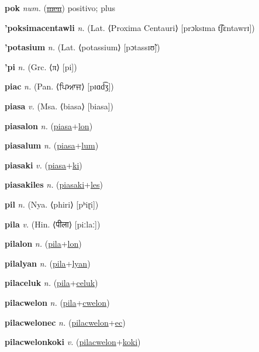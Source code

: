 \textbf{\hypertarget{pok}{pok}} \textit{num.} (\hyperlink{men}{\sout{men}})
positivo; plus

\textbf{\hypertarget{'poksimacentawli}{'poksimacentawli}} \textit{n.} (Lat. ⟨Proxima Centauri⟩ [prɔksɪma t͡ʃɛntawrɪ])


\textbf{\hypertarget{'potasium}{'potasium}} \textit{n.} (Lat. ⟨potassium⟩ [pɔtassɪʊ̃])


\textbf{\hypertarget{'pi}{'pi}} \textit{n.} (Grc. ⟨π⟩ [pi])


\textbf{\hypertarget{piac}{piac}} \textit{n.} (Pan. ⟨{\gurmukhi{}ਪਿਆਜ}⟩ [pɪɑd͡ʒ])


\textbf{\hypertarget{piasa}{piasa}} \textit{v.} (Msa. ⟨biasa⟩ [biasa])


\textbf{\hypertarget{piasalon}{piasalon}} \textit{n.} (\hyperlink{piasa}{piasa}+\allowbreak \hyperlink{lon}{lon})


\textbf{\hypertarget{piasalum}{piasalum}} \textit{n.} (\hyperlink{piasa}{piasa}+\allowbreak \hyperlink{lum}{lum})


\textbf{\hypertarget{piasaki}{piasaki}} \textit{v.} (\hyperlink{piasa}{piasa}+\allowbreak \hyperlink{ki}{ki})


\textbf{\hypertarget{piasakiles}{piasakiles}} \textit{n.} (\hyperlink{piasaki}{piasaki}+\allowbreak \hyperlink{les}{les})


\textbf{\hypertarget{pil}{pil}} \textit{n.} (Nya. ⟨phiri⟩ [pʰiɽi])


\textbf{\hypertarget{pila}{pila}} \textit{v.} (Hin. ⟨{\devanagari{}पीला}⟩ [piːlaː])


\textbf{\hypertarget{pilalon}{pilalon}} \textit{n.} (\hyperlink{pila}{pila}+\allowbreak \hyperlink{lon}{lon})


\textbf{\hypertarget{pilalyan}{pilalyan}} \textit{n.} (\hyperlink{pila}{pila}+\allowbreak \hyperlink{lyan}{lyan})


\textbf{\hypertarget{pilaceluk}{pilaceluk}} \textit{n.} (\hyperlink{pila}{pila}+\allowbreak \hyperlink{celuk}{celuk})


\textbf{\hypertarget{pilacwelon}{pilacwelon}} \textit{n.} (\hyperlink{pila}{pila}+\allowbreak \hyperlink{cwelon}{cwelon})


\textbf{\hypertarget{pilacwelonec}{pilacwelonec}} \textit{n.} (\hyperlink{pilacwelon}{pilacwelon}+\allowbreak \hyperlink{ec}{ec})


\textbf{\hypertarget{pilacwelonkoki}{pilacwelonkoki}} \textit{v.} (\hyperlink{pilacwelon}{pilacwelon}+\allowbreak \hyperlink{koki}{koki})



